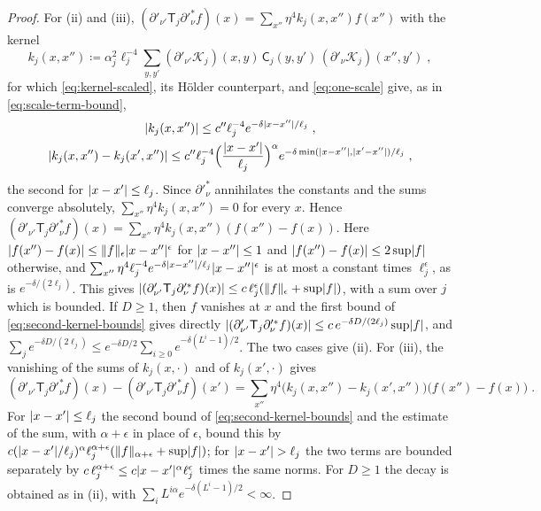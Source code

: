 \documentclass[11pt]{preprint}
\DeclarePairedDelimiter{\abs}{\lvert}{\rvert}
\DeclarePairedDelimiter{\norm}{\lVert}{\rVert}
\numberwithin{equation}{section}
\theoremstyle{definition}
\theoremstyle{remark}
\theoremstyle{plain}
\begin{document}
\begin{proof}
For (ii) and (iii), $(\partial'_{\nu'}\mathsf T_j\partial'^*_\nu f)(x) = \sum_{x''}\eta^4k_j(x, x'')f(x'')$ with the kernel
\begin{equation}\label{eq:second-kernel}
    k_j(x, x'') \coloneqq \alpha_j^2\ell_j^{-4}\sum_{y,y'}(\partial'_{\nu'}\mathcal K_j)(x, y)\,\mathsf C_j(y, y')\,(\partial'_\nu\mathcal K_j)(x'', y')\;,
\end{equation}
for which \eqref{eq:kernel-scaled}, its H\"older counterpart, and \eqref{eq:one-scale} give, as in \eqref{eq:scale-term-bound},
\begin{equation}\label{eq:second-kernel-bounds}
\begin{gathered}
    \abs{k_j(x, x'')} \leq c''\ell_j^{-4}e^{-\delta\abs{x - x''}/\ell_j}\;,\\
    \abs{k_j(x, x'') - k_j(x', x'')} \leq c''\ell_j^{-4}\Bigl(\frac{\abs{x - x'}}{\ell_j}\Bigr)^{\alpha}e^{-\delta\min(\abs{x - x''}, \abs{x' - x''})/\ell_j}\;,
\end{gathered}
\end{equation}
the second for $\abs{x - x'} \leq \ell_j$. Since $\partial'^*_\nu$ annihilates the constants and the sums converge absolutely, $\sum_{x''}\eta^4k_j(x, x'') = 0$ for every $x$. Hence $(\partial'_{\nu'}\mathsf T_j\partial'^*_\nu f)(x) = \sum_{x''}\eta^4k_j(x, x'')(f(x'') - f(x))$. Here $\abs{f(x'') - f(x)} \leq \norm{f}_\epsilon\abs{x - x''}^\epsilon$ for $\abs{x - x''} \leq 1$ and $\abs{f(x'') - f(x)} \leq 2\sup\abs f$ otherwise, and $\sum_{x''}\eta^4\ell_j^{-4}e^{-\delta\abs{x - x''}/\ell_j}\abs{x - x''}^\epsilon$ is at most a constant times $\ell_j^\epsilon$, as is $e^{-\delta/(2\ell_j)}$. This gives $\abs{(\partial'_{\nu'}\mathsf T_j\partial'^*_\nu f)(x)} \leq c\,\ell_j^\epsilon(\norm{f}_\epsilon + \sup\abs f)$, with a sum over $j$ which is bounded. If $D \geq 1$, then $f$ vanishes at $x$ and the first bound of \eqref{eq:second-kernel-bounds} gives directly $\abs{(\partial'_{\nu'}\mathsf T_j\partial'^*_\nu f)(x)} \leq c\,e^{-\delta D/(2\ell_j)}\sup\abs f$, and $\sum_je^{-\delta D/(2\ell_j)} \leq e^{-\delta D/2}\sum_{i \geq 0}e^{-\delta(L^i - 1)/2}$. The two cases give (ii). For (iii), the vanishing of the sums of $k_j(x, \cdot)$ and of $k_j(x', \cdot)$ gives
\begin{equation}\label{eq:second-difference-kernel}
    (\partial'_{\nu'}\mathsf T_j\partial'^*_\nu f)(x) - (\partial'_{\nu'}\mathsf T_j\partial'^*_\nu f)(x') = \sum_{x''}\eta^4\bigl(k_j(x, x'') - k_j(x', x'')\bigr)\bigl(f(x'') - f(x)\bigr)\;.
\end{equation}
For $\abs{x - x'} \leq \ell_j$ the second bound of \eqref{eq:second-kernel-bounds} and the estimate of the sum, with $\alpha + \epsilon$ in place of $\epsilon$, bound this by $c(\abs{x - x'}/\ell_j)^\alpha\ell_j^{\alpha+\epsilon}(\norm{f}_{\alpha+\epsilon} + \sup\abs f)$; for $\abs{x - x'} > \ell_j$ the two terms are bounded separately by $c\,\ell_j^{\alpha+\epsilon} \leq c\abs{x - x'}^\alpha\ell_j^\epsilon$ times the same norms. For $D \geq 1$ the decay is obtained as in (ii), with $\sum_i L^{i\alpha}e^{-\delta(L^i - 1)/2} < \infty$.


\end{proof}
\end{document}

